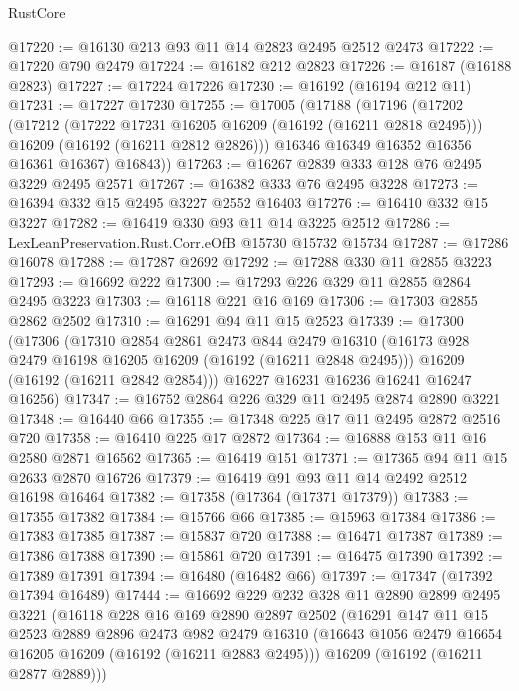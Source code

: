 \begin{lexlean}{RustCore}
\begin{coremodule}
@17220 := @16130 @213 @93 @11 @14 @2823 @2495 @2512 @2473
@17222 := @17220 @790 @2479
@17224 := @16182 @212 @2823
@17226 := @16187 (@16188 @2823)
@17227 := @17224 @17226
@17230 := @16192 (@16194 @212 @11)
@17231 := @17227 @17230
@17255 := @17005
    (@17188
      (@17196
        (@17202
          (@17212
            (@17222 @17231 @16205 @16209 (@16192 (@16211 @2818 @2495)))
            @16209
            (@16192 (@16211 @2812 @2826)))
          @16346
          @16349
          @16352
          @16356
          @16361
          @16367)
        @16843))
@17263 := @16267 @2839 @333 @128 @76 @2495 @3229 @2495 @2571
@17267 := @16382 @333 @76 @2495 @3228
@17273 := @16394 @332 @15 @2495 @3227 @2552 @16403
@17276 := @16410 @332 @15 @3227
@17282 := @16419 @330 @93 @11 @14 @3225 @2512
@17286 := LexLeanPreservation.Rust.Corr.eOfB @15730 @15732 @15734
@17287 := @17286 @16078
@17288 := @17287 @2692
@17292 := @17288 @330 @11 @2855 @3223
@17293 := @16692 @222
@17300 := @17293 @226 @329 @11 @2855 @2864 @2495 @3223
@17303 := @16118 @221 @16 @169
@17306 := @17303 @2855 @2862 @2502
@17310 := @16291 @94 @11 @15 @2523
@17339 := @17300
    (@17306
      (@17310
        @2854
        @2861
        @2473
        @844
        @2479
        @16310
        (@16173 @928 @2479 @16198 @16205 @16209 (@16192 (@16211 @2848 @2495)))
        @16209
        (@16192 (@16211 @2842 @2854)))
      @16227
      @16231
      @16236
      @16241
      @16247
      @16256)
@17347 := @16752 @2864 @226 @329 @11 @2495 @2874 @2890 @3221
@17348 := @16440 @66
@17355 := @17348 @225 @17 @11 @2495 @2872 @2516 @720
@17358 := @16410 @225 @17 @2872
@17364 := @16888 @153 @11 @16 @2580 @2871 @16562
@17365 := @16419 @151
@17371 := @17365 @94 @11 @15 @2633 @2870 @16726
@17379 := @16419 @91 @93 @11 @14 @2492 @2512 @16198 @16464
@17382 := @17358 (@17364 (@17371 @17379))
@17383 := @17355 @17382
@17384 := @15766 @66
@17385 := @15963 @17384
@17386 := @17383 @17385
@17387 := @15837 @720
@17388 := @16471 @17387
@17389 := @17386 @17388
@17390 := @15861 @720
@17391 := @16475 @17390
@17392 := @17389 @17391
@17394 := @16480 (@16482 @66)
@17397 := @17347 (@17392 @17394 @16489)
@17444 := @16692
    @229
    @232
    @328
    @11
    @2890
    @2899
    @2495
    @3221
    (@16118
      @228
      @16
      @169
      @2890
      @2897
      @2502
      (@16291
        @147
        @11
        @15
        @2523
        @2889
        @2896
        @2473
        @982
        @2479
        @16310
        (@16643 @1056 @2479 @16654 @16205 @16209 (@16192 (@16211 @2883 @2495)))
        @16209
        (@16192 (@16211 @2877 @2889)))

\end{coremodule}
\end{lexlean}
